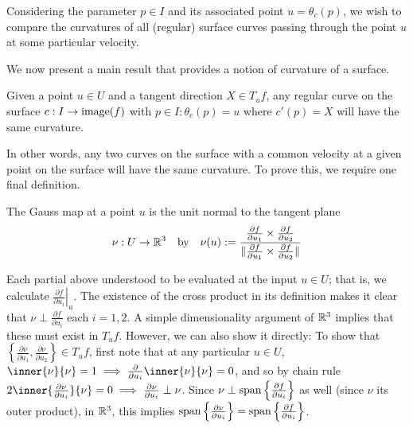  Considering the parameter $p \in I$ and its associated point $u = \theta_c(p)$, we wish to compare the curvatures of all (regular) surface curves passing through the point $u$ at some particular velocity.
 
 We now present a main result that provides a notion of curvature of a surface.

	\begin{theorem} \label{thm:meusnier}
		Given a point $u \in U $ and a tangent direction $X \in T_u f$,
  any regular curve on the surface $c: I \to \mathrm{image}(f)$ with $p\in I : \theta_c(p) = u$
  where $c'(p) = X$ will have the same curvature.
	\end{theorem}
	
	
	In other words, any two curves on the surface with a common velocity at a given point on the surface will have the same curvature. To prove this, we require one final definition.
	
	\begin{defn} \label{def:gauss-map}
		The Gauss map at a point $u$  is the unit normal to the tangent plane
		\[\nu : U \to \mathbb{R}^3 \quad\textrm{by}\quad  \nu(u) :=
		\frac{\frac{\partial f}{\partial u_1} \times \frac{\partial f}{\partial u_2}}
		{\Vert\frac{\partial f}{\partial u_1} \times \frac{\partial f}{\partial u_2}\Vert} \]
	\end{defn}
	Each partial above understood to be evaluated at the input $u \in U$; that is, we calculate $\left.\frac{\partial f}{\partial u_i}\right|_u$.
	The existence of the cross product in its definition makes it clear that $\nu \perp \frac{\partial f}{\partial u_i}$ each $i=1,2$. A simple dimensionality argument of $\mathbb{R}^3$ implies that these must exist in $T_uf$. However, we can also show it directly: 
	To show that $\left\{\frac{\partial \nu}{\partial u_1} , \frac{\partial \nu}{\partial u_2}\right\} \in T_u f$,
	first note that at any particular $u \in U$,
	$\inner{\nu}{\nu} = 1 \implies \frac{\partial}{\partial u_i} \inner{\nu}{\nu} = 0$,
	and so by chain rule $2\inner{\frac{\partial \nu}{\partial u_i}}{\nu} = 0
	\implies \frac{\partial \nu}{\partial u_i} \perp \nu $.
	Since $ \nu \perp \mathrm{span}\left\{\frac{\partial f}{\partial u_i}\right\} $ as well (since $\nu$ its outer product), in  $\mathbb{R}^3$, this implies
	$\spn\left\{\frac{\partial \nu}{\partial u_i}\right\} = %
	\spn\left\{\frac{\partial f}{\partial u_i}\right\}$.
	
